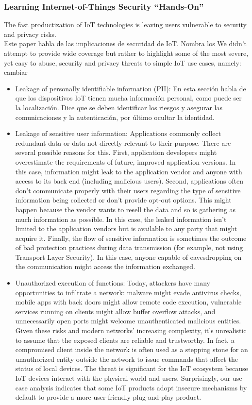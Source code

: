 \subsubsection{Learning Internet-of-Things Security ``Hands-On''}\cite{Paper10}
The fast productization of IoT technologies is leaving users vulnerable to security and privacy risks.\\
Este paper habla de las implicaciones de securidad de IoT. Nombra los We didn't attempt to provide wide coverage but rather to highlight some of the most severe, yet easy to abuse, security and privacy threats to simple IoT use cases, namely:
cambiar
\begin{itemize}
	\item Leakage of personally identifiable information (PII): En esta sección habla de que los dispositivos IoT tienen mucha información personal, como puede ser la localización. Dice que se deben identificar los riesgos y asegurar las comunicaciones y la autenticación, por último ocultar la identidad.
	\item Leakage of sensitive user information: Applications commonly collect redundant data or data not directly relevant to their purpose. There are several possible reasons for this. First, application developers might overestimate the requirements of future, improved application versions. In this case, information might leak to the application vendor and anyone with access to its back end (including malicious users). Second, applications often don't communicate properly with their users regarding the type of sensitive information being collected or don't provide opt-out options. This might happen because the vendor wants to resell the data and so is gathering as much information as possible. In this case, the leaked information isn't limited to the application vendors but is available to any party that might acquire it. Finally, the flow of sensitive information is sometimes the outcome of bad protection practices during data transmission (for example, not using Transport Layer Security). In this case, anyone capable of eavesdropping on the communication might access the information exchanged.
	\item Unauthorized execution of functions: Today, attackers have many opportunities to infiltrate a network: malware might evade antivirus checks, mobile apps with back doors might allow remote code execution, vulnerable services running on clients might allow buffer overflow attacks, and unnecessarily open ports might welcome unauthenticated malicious entities. Given these risks and modern networks' increasing complexity, it's unrealistic to assume that the exposed clients are reliable and trustworthy. In fact, a compromised client inside the network is often used as a stepping stone for an unauthorized entity outside the network to issue commands that affect the status of local devices. The threat is significant for the IoT ecosystem because IoT devices interact with the physical world and users. Surprisingly, our use case analysis indicates that some IoT products adopt insecure mechanisms by default to provide a more user-friendly plug-and-play product.
\end{itemize}

